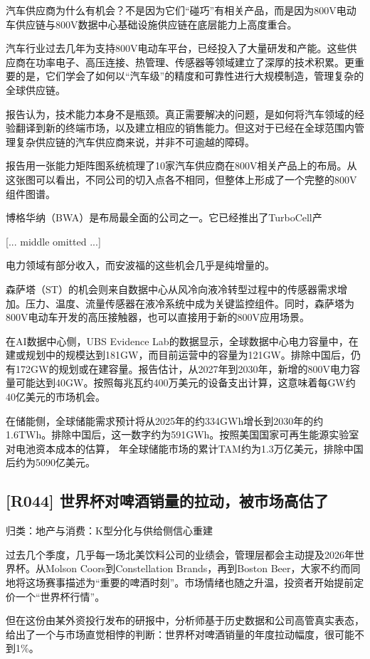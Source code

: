 \documentclass[11pt]{ctexart}
\begin{document}
汽车供应商为什么有机会？不是因为它们“碰巧”有相关产品，而是因为800V电动车供应链与800V数据中心基础设施供应链在底层能力上高度重合。

汽车行业过去几年为支持800V电动车平台，已经投入了大量研发和产能。这些供应商在功率电子、高压连接、热管理、传感器等领域建立了深厚的技术积累。更重要的是，它们学会了如何以“汽车级”的精度和可靠性进行大规模制造，管理复杂的全球供应链。

报告认为，技术能力本身不是瓶颈。真正需要解决的问题，是如何将汽车领域的经验翻译到新的终端市场，以及建立相应的销售能力。但这对于已经在全球范围内管理复杂供应链的汽车供应商来说，并非不可逾越的障碍。

报告用一张能力矩阵图系统梳理了10家汽车供应商在800V相关产品上的布局。从这张图可以看出，不同公司的切入点各不相同，但整体上形成了一个完整的800V组件图谱。

博格华纳（BWA）是布局最全面的公司之一。它已经推出了TurboCell产

[... middle omitted ...]

电力领域有部分收入，而安波福的这些机会几乎是纯增量的。

森萨塔（ST）的机会则来自数据中心从风冷向液冷转型过程中的传感器需求增加。压力、温度、流量传感器在液冷系统中成为关键监控组件。同时，森萨塔为800V电动车开发的高压接触器，也可以直接用于新的800V应用场景。

在AI数据中心侧，UBS Evidence Lab的数据显示，全球数据中心电力容量中，在建或规划中的规模达到181GW，而目前运营中的容量为121GW。排除中国后，仍有172GW的规划或在建容量。报告估计，从2027年到2030年，新增的800V电力容量可能达到40GW。按照每兆瓦约400万美元的设备支出计算，这意味着每GW约40亿美元的市场机会。

在储能侧，全球储能需求预计将从2025年的约334GWh增长到2030年的约1.6TWh。排除中国后，这一数字约为591GWh。按照美国国家可再生能源实验室对电池资本成本的估算， 年全球储能市场的累计TAM约为1.3万亿美元，排除中国后约为5090亿美元。

\subsection{[R044] 世界杯对啤酒销量的拉动，被市场高估了}
{\small\color{refgray}归类：地产与消费：K型分化与供给侧信心重建}

过去几个季度，几乎每一场北美饮料公司的业绩会，管理层都会主动提及2026年世界杯。从Molson Coors到Constellation Brands，再到Boston Beer，大家不约而同地将这场赛事描述为“重要的啤酒时刻”。市场情绪也随之升温，投资者开始提前定价一个“世界杯行情”。

但在这份由某外资投行发布的研报中，分析师基于历史数据和公司高管真实表态，给出了一个与市场直觉相悖的判断：世界杯对啤酒销量的年度拉动幅度，很可能不到1\%。
\end{document}
